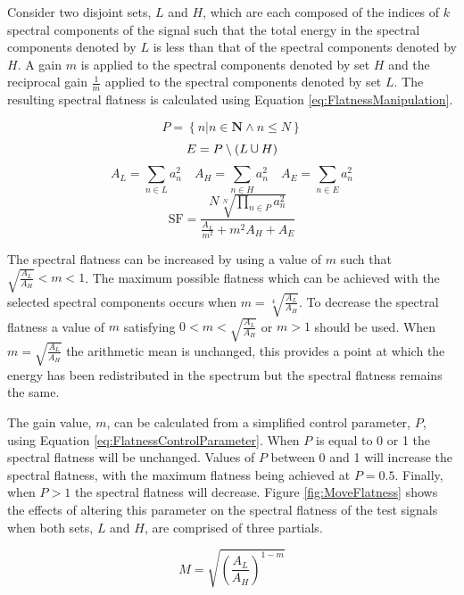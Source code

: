 			Consider two disjoint sets, $L$ and $H$, which are each composed of the indices of $k$ spectral
			components of the signal such that the total energy in the spectral components denoted by $L$ is
			less than that of the spectral components denoted by $H$. A gain $m$ is applied to the spectral
			components denoted by set $H$ and the reciprocal gain $\frac{1}{m}$ applied to the spectral
			components denoted by set $L$. The resulting spectral flatness is calculated using Equation
			\ref{eq:FlatnessManipulation}.

			\[ P = \left\{ n | n \in \textbf{N} \land n \leq N \right\} \]
			\[ E = P \setminus (L \medcup H) \]
			\[ A_{L} = \sum_{n \in L} a_{n}^{2} \quad A_{H} = \sum_{n \in H} a_{n}^{2}
			   \quad A_{E} = \sum_{n \in E} a_{n}^{2} \]
			\begin{equation}
				\textrm{SF} = \frac{N\sqrt[N]{\prod_{n \in P} a_{n}^{2}}}
						   {\frac{A_{L}}{m^{2}} + m^{2}A_{H} + A_{E}}
				\label{eq:FlatnessManipulation}
			\end{equation}

			The spectral flatness can be increased by using a value of $m$ such that
			$\sqrt{\frac{A_{L}}{A_{H}}} < m < 1$. The maximum possible flatness which can be achieved with the
			selected spectral components occurs when $m = \sqrt[4]{\frac{A_{L}}{A_{H}}}$. To decrease the
			spectral flatness a value of $m$ satisfying $0 < m < \sqrt{\frac{A_{L}}{A_{H}}}$ or $m > 1$ should
			be used. When $m = \sqrt{\frac{A_{L}}{A_{H}}}$ the arithmetic mean is unchanged, this provides a
			point at which the energy has been redistributed in the spectrum but the spectral flatness remains
			the same. 

			The gain value, $m$, can be calculated from a simplified control parameter, $P$, using Equation
			\ref{eq:FlatnessControlParameter}. When $P$ is equal to 0 or 1 the spectral flatness will be
			unchanged. Values of $P$ between 0 and 1 will increase the spectral flatness, with the maximum
			flatness being achieved at $P = 0.5$. Finally, when $P > 1$ the spectral flatness will decrease.
			Figure \ref{fig:MoveFlatness} shows the effects of altering this parameter on the spectral flatness
			of the test signals when both sets, $L$ and $H$, are comprised of three partials.

			\begin{equation}
				M = \sqrt{ \left( \frac{A_L}{A_H} \right) ^{1 - m}}
				\label{eq:FlatnessControlParameter}
			\end{equation}

